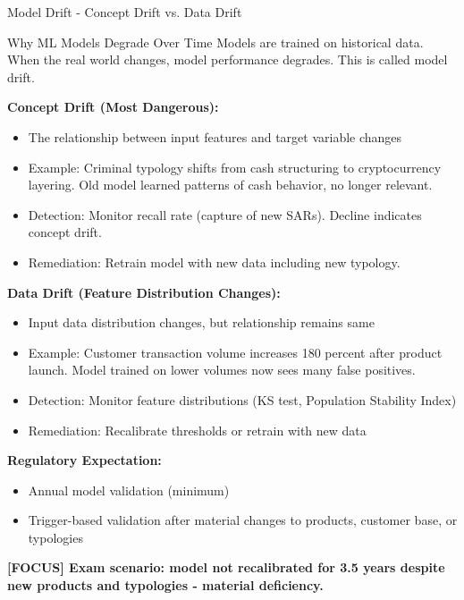 \documentclass[11pt,a4paper]{beamer}
\newcommand{\examfocus}[1]{\textcolor{orange!80!black}{\textbf{[FOCUS] #1}}}
\begin{document}
	\begin{frame}{Model Drift - Concept Drift vs. Data Drift}
		\begin{block}{Why ML Models Degrade Over Time}
			Models are trained on historical data. When the real world changes, model performance degrades. This is called model drift.
		\end{block}
		
		\textbf{Concept Drift (Most Dangerous):}
		\begin{itemize}
			\item The relationship between input features and target variable changes
			\item Example: Criminal typology shifts from cash structuring to cryptocurrency layering. Old model learned patterns of cash behavior, no longer relevant.
			\item Detection: Monitor recall rate (capture of new SARs). Decline indicates concept drift.
			\item Remediation: Retrain model with new data including new typology.
		\end{itemize}
		
		\textbf{Data Drift (Feature Distribution Changes):}
		\begin{itemize}
			\item Input data distribution changes, but relationship remains same
			\item Example: Customer transaction volume increases 180 percent after product launch. Model trained on lower volumes now sees many false positives.
			\item Detection: Monitor feature distributions (KS test, Population Stability Index)
			\item Remediation: Recalibrate thresholds or retrain with new data
		\end{itemize}
		
		\textbf{Regulatory Expectation:}
		\begin{itemize}
			\item Annual model validation (minimum)
			\item Trigger-based validation after material changes to products, customer base, or typologies
		\end{itemize}
		
		\examfocus{Exam scenario: model not recalibrated for 3.5 years despite new products and typologies - material deficiency.}
	\end{frame}
	
\end{document}
